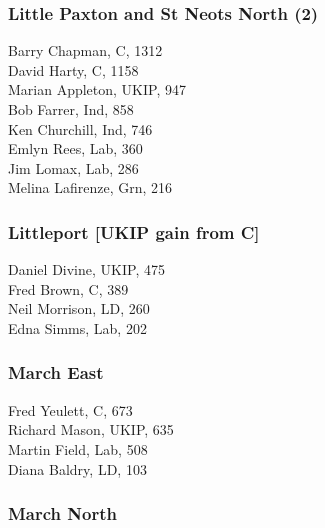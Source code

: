 \documentclass[a4paper,openany,10pt]{book}
\begin{document}
\subsubsection*{Little Paxton and St Neots North (2)}



Barry Chapman, C, 1312\\
David Harty, C, 1158\\
Marian Appleton, UKIP, 947\\
Bob Farrer, Ind, 858\\
Ken Churchill, Ind, 746\\
Emlyn Rees, Lab, 360\\
Jim Lomax, Lab, 286\\
Melina Lafirenze, Grn, 216\\


\subsubsection*{Littleport \hspace*{\fill}\nolinebreak[1]%
\enspace\hspace*{\fill}
[UKIP gain from C]}



Daniel Divine, UKIP, 475\\
Fred Brown, C, 389\\
Neil Morrison, LD, 260\\
Edna Simms, Lab, 202\\


\subsubsection*{March East}



Fred Yeulett, C, 673\\
Richard Mason, UKIP, 635\\
Martin Field, Lab, 508\\
Diana Baldry, LD, 103\\


\subsubsection*{March North}
\end{document}
